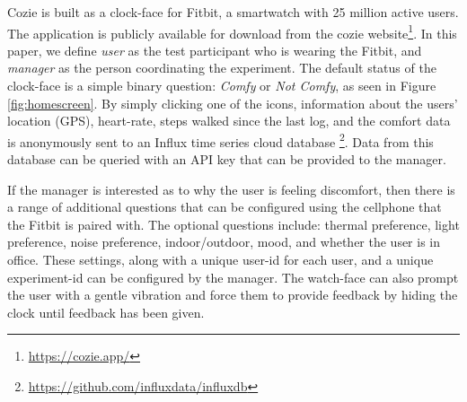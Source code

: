 
Cozie is built as a clock-face for Fitbit, a smartwatch with 25 million active users. The application is publicly available for download from the cozie website\footnote{\url{https://cozie.app/}}. In this paper, we define \emph{user} as the test participant who is wearing the Fitbit, and \emph{manager} as the person coordinating the experiment. The default status of the clock-face is a simple binary question: \emph{Comfy} or \emph{Not Comfy}, as seen in Figure \ref{fig:homescreen}. By simply clicking one of the icons, information about the users' location (GPS), heart-rate, steps walked since the last log, and the comfort data is anonymously sent to an Influx time series cloud database \footnote{\url{https://github.com/influxdata/influxdb}}. Data from this database can be queried with an API key that can be provided to the manager. 

If the manager is interested as to why the user is feeling discomfort, then there is a range of additional questions that can be configured using the cellphone that the Fitbit is paired with. The optional questions include: thermal preference, light preference, noise preference, indoor/outdoor, mood, and whether the user is in office. These settings, along with a unique user-id for each user, and a unique experiment-id can be configured by the manager. The watch-face can also prompt the user with a gentle vibration and force them to provide feedback by hiding the clock until feedback has been given.



